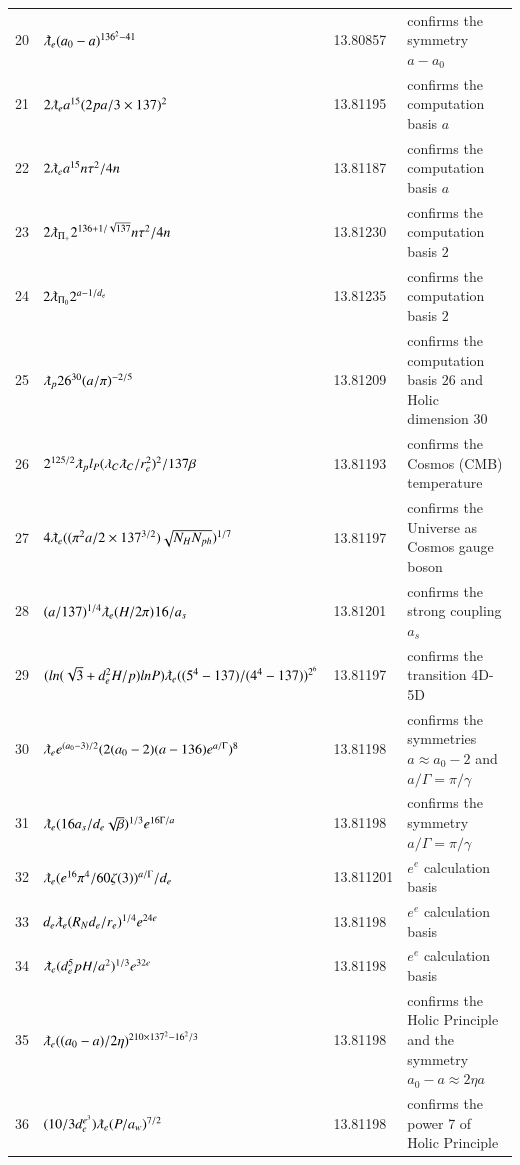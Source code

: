 \documentclass[a4paper,9pt]{article}
\begin{document}
\begin{appendix}
\begin{table}
\begin{tabular}{llll}
    20 & $ \lambdabar_{e}(a_0-a)^{136^2-41}   $ & 13.80857 & confirms the symmetry $a-a_0$ \\
    21 & $ 2 \lambdabar_{e} a^{15} (2pa/3\times 137)^2   $ & 13.81195 & confirms the computation basis $a$ \\
    22 & $ 2 \lambdabar_{e} a^{15} n \tau^2 /4n  $ & 13.81187 & confirms the computation basis $a$ \\
    23 & $ 2 \lambdabar_{\Pi_+} 2^{136+1/\sqrt{137}} n \tau^2 /4n  $ & 13.81230 & confirms the computation basis $2$ \\
    24 & $ 2 \lambdabar_{\Pi_0} 2^{a-1/d_e} $ & 13.81235 & confirms the computation basis $2$ \\
    25 & $  \lambdabar_{p} 26^{30} (a/\pi)^{-2/5} $ & 13.81209 & confirms the computation basis $26$ and Holic dimension 30 \\
    26 & $ 2^{125/2} \lambdabar_p l_P (\lambda_C \lambdabar_C/ r_e^2)^2/137\beta  $ & 13.81193 & confirms the Cosmos (CMB) temperature\\
    27 & $ 4 \lambdabar_{e} ((\pi^2 a/2 \times 137^{3/2})\sqrt{N_H N_{ph}})^{1/7} $ & 13.81197 & confirms the Universe as Cosmos gauge boson \\
    28 & $ (a/137)^{1/4} \lambdabar_{e} (H/2\pi)^{}16/a_s  $ & 13.81201 & confirms the strong coupling $a_s$  \\
    29 & $ (ln(\sqrt3+d_e^2 H/p)lnP) \lambdabar_{e} ((5^4-137)/(4^4-137))^{2^6}  $ & 13.81197 & confirms the transition 4D-5D  \\
    30 & $ \lambdabar_{e} e^{(a_0-3)/2} (2(a_0-2)(a-136)e^{a/\Gamma})^8  $ & 13.81198 & confirms the symmetries $a \approx a_0 - 2$ and $a/\Gamma = \pi/\gamma $  \\
    31 & $ \lambdabar_{e} (16a_s/d_e \sqrt \beta)^{1/3} e^{16\Gamma/a}   $ & 13.81198 & confirms the symmetry $a/\Gamma = \pi/\gamma$  \\
    32 & $  \lambdabar_{e} (e^{16}\pi^4/60 \zeta(3))^{a/\Gamma} /d_e  $ & 13.811201 & $e^e$ calculation basis \\
    33 & $ d_e \lambdabar_{e} (R_N d_e/r_e)^{1/4} e^{24e}   $ & 13.81198 & $e^e$ calculation basis \\
    34 & $ \lambdabar_{e} (d_e^5 pH/a^2)^{1/3} e^{32e}   $ & 13.81198 & $e^e$ calculation basis \\
    35 & $ \lambdabar_{e} ((a_0-a)/2\eta)^{210 \times 137^2-16^2/3}   $ & 13.81198 & confirms the Holic Principle and the symmetry $a_0 - a \approx 2\eta a $ \\
    36 & $ (10/3d_e^{e^3})\lambdabar_{e}  (P/a_w)^{7/2} $ & 13.81198 & confirms the power 7 of Holic Principle \\

\end{tabular}
\end{table}
\end{appendix}
\end{document}
